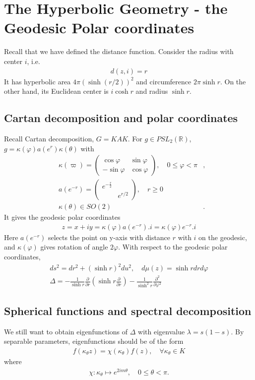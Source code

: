 \documentclass[11pt,reqno]{amsart}
\newcommand{\bna}{\begin{eqnarray*}}
\newcommand{\ena}{\end{eqnarray*}}
\newcommand{\bma}{\begin{pmatrix}}
\newcommand{\ema}{\end{pmatrix}}
\def\R{\mathbb{R}}
\theoremstyle{definition}
\begin{document}
\section{The Hyperbolic Geometry - the Geodesic Polar coordinates}
Recall that we have defined the distance function. Consider the radius with center $i$, i.e.
\bna
d(z,i)=r
\ena
It has hyperbolic area $4\pi(\sinh(r/2))^2$ and circumference $2\pi\sinh r$.
On the other hand, its Euclidean center is $i\cosh r$ and radius $\sinh r$.

\subsection{Cartan decomposition and polar coordinates}
Recall Cartan decomposition,
$G=KAK$. For $g\in PSL_2(\R)$,  $g=\kappa(\varphi)a(e^r)\kappa(\theta)$ with
\bna
&\kappa(\varpi)=\bma\cos\varphi&\sin\varphi\\ -\sin\varphi&\cos\varphi\ema,
\quad 0\leq\varphi<\pi&,\\
&a(e^{-r})=\bma e^{-\frac{r}{2}}\\&e^{r/2}\ema,\quad r\geq 0&\\
&\kappa(\theta)\in SO(2)&.
\ena
It gives the geodesic polar coordinates
\bna
z=x+iy=\kappa(\varphi) a(e^{-r}).i=\kappa(\varphi) e^{-r}.i
\ena
Here $a(e^{-r})$ selects the point on y-axis  with distance $r$ with $i$ on the geodesic,
and $\kappa(\varphi)$ gives rotation of angle $2\varphi$.
With respect to the geodesic polar coordinates,
\bna
&ds^2=dr^2+(\sinh r)^2du^2,\quad d\mu(z)=\sinh r dr d\varphi &\\
&\Delta=-\frac{1}{\sinh r}\frac{\partial}{\partial r}\left(\sinh r\frac{\partial}{\partial r}\right)
-\frac{1}{\sinh^2 r}\frac{\partial^2}{\partial \varphi^2}
\ena
\subsection{Spherical functions and spectral decomposition}

We still want to obtain eigenfunctions of $\Delta$ with eigenvalue $\lambda=s(1-s)$. By separable parameters, eigenfunctions should be of the form
\bna
f(\kappa_\theta z)=\chi(\kappa_\theta)f(z),\quad\forall\kappa_\theta\in K
\ena
where
\bna
\chi:\kappa_\theta\mapsto e^{2i m\theta},\quad 0\leq\theta<\pi.
\ena
\end{document}
